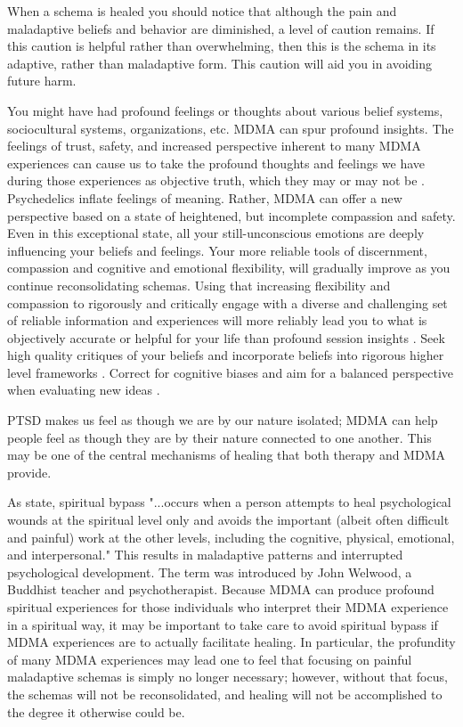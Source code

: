 \documentclass[12pt,letterpaper]{book}
\begin{document}
When a schema is healed you should notice that although the pain and maladaptive beliefs and behavior are diminished, a level of caution remains. If this caution is helpful rather than overwhelming, then this is the schema in its adaptive, rather than maladaptive form. This caution will aid you in avoiding future harm.

You might have had profound feelings or thoughts about various belief systems, sociocultural systems, organizations, etc. MDMA can spur profound insights. The feelings of trust, safety, and increased perspective inherent to many MDMA experiences can cause us to take the profound thoughts and feelings we have during those experiences as objective truth, which they may or may not be \cite{hartogsohn2018meaning}. Psychedelics inflate feelings of meaning. Rather, MDMA can offer a new perspective based on a state of heightened, but incomplete compassion and safety. Even in this exceptional state, all your still-unconscious emotions are deeply influencing your beliefs and feelings. Your more reliable tools of discernment, compassion and cognitive and emotional flexibility, will gradually improve as you continue reconsolidating schemas. Using that increasing flexibility and compassion to rigorously and critically engage with a diverse and challenging set of reliable information and experiences will more reliably lead you to what is objectively accurate or helpful for your life than profound session insights \cite{bentzMindfulInquiry}. Seek high quality critiques of your beliefs and incorporate beliefs into rigorous higher level frameworks \cite{saganDemon}. Correct for cognitive biases and aim for a balanced perspective when evaluating new ideas \cite{galefScoutMindset}.

PTSD makes us feel as though we are by our nature isolated; MDMA can help people feel as though they are by their nature connected to one another. This may be one of the central mechanisms of healing that both therapy and MDMA provide.

As \textcite{cashwell2007Bypass} state, spiritual bypass "...occurs when a person attempts to heal psychological wounds at the spiritual  level only and avoids the important (albeit often difficult and painful) work at the other levels, including the cognitive, physical, emotional, and interpersonal." This results in maladaptive patterns and interrupted psychological development. The term was introduced by John Welwood, a Buddhist teacher and psychotherapist. Because MDMA can produce profound spiritual experiences for those individuals who interpret their MDMA experience in a spiritual way, it may be important to take care to avoid spiritual bypass if MDMA experiences are to actually facilitate healing. In particular, the profundity of many MDMA experiences may lead one to feel that focusing on painful maladaptive schemas is simply no longer necessary; however, without that focus, the schemas will not be reconsolidated, and healing will not be accomplished to the degree it otherwise could be.
\end{document}
